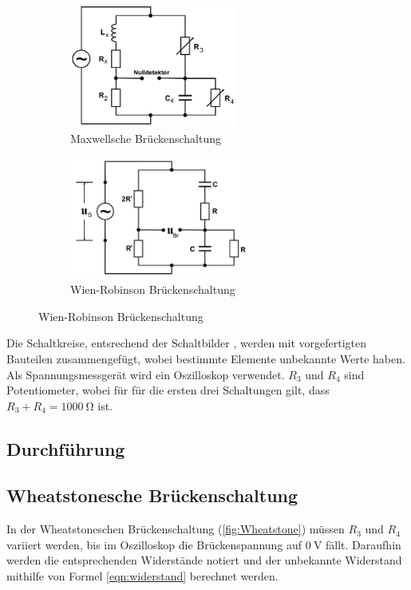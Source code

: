 \begin{figure}
    \begin{subfigure}{0.5\textwidth}
        \centering
        \includegraphics[height=4cm]{Bilder/Maxwell}
        \caption{Maxwellsche Brückenschaltung}
        \label{fig:Maxwell}
    \end{subfigure}
    \begin{subfigure}{0.5\textwidth}
        \centering
        \includegraphics[height=4cm]{Bilder/Wien-Robinson}
        \caption{Wien-Robinson Brückenschaltung}
        \label{fig:Wien}
    \end{subfigure}
\end{figure}



\noindent Die Schaltkreise, entsrechend der Schaltbilder \cite{v302}, werden
mit vorgefertigten Bauteilen zusammengefügt, wobei bestimmte Elemente unbekannte Werte haben.
Als Spannungsmessgerät wird ein Oszilloskop verwendet. $R_3$ und $R_4$ sind Potentiometer, wobei für
für die ersten drei Schaltungen gilt, dass $R_3+R_4=\qty{1000}{\ohm}$ ist.

\subsection{Durchführung}

\subsection{Wheatstonesche Brückenschaltung}
In der Wheatstoneschen Brückenschaltung (\ref{fig:Wheatstone}) müssen $R_3$ und $R_4$ variiert werden, 
bis im Oszilloskop die Brückenspannung auf $\qty{0}{\volt}$ fällt. Daraufhin werden die entsprechenden Widerstände
notiert und der unbekannte Widerstand mithilfe von Formel \ref{eqn:widerstand} berechnet werden.

